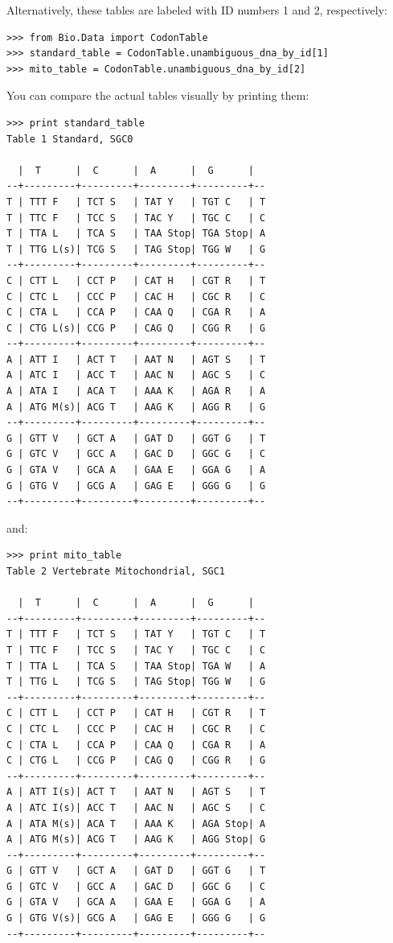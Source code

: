 \documentclass{report}
\begin{document}
Alternatively, these tables are labeled with ID numbers 1 and 2, respectively:
\begin{verbatim}
>>> from Bio.Data import CodonTable
>>> standard_table = CodonTable.unambiguous_dna_by_id[1]
>>> mito_table = CodonTable.unambiguous_dna_by_id[2]
\end{verbatim}

You can compare the actual tables visually by printing them:
\begin{verbatim}
>>> print standard_table
Table 1 Standard, SGC0

  |  T      |  C      |  A      |  G      |
--+---------+---------+---------+---------+--
T | TTT F   | TCT S   | TAT Y   | TGT C   | T
T | TTC F   | TCC S   | TAC Y   | TGC C   | C
T | TTA L   | TCA S   | TAA Stop| TGA Stop| A
T | TTG L(s)| TCG S   | TAG Stop| TGG W   | G
--+---------+---------+---------+---------+--
C | CTT L   | CCT P   | CAT H   | CGT R   | T
C | CTC L   | CCC P   | CAC H   | CGC R   | C
C | CTA L   | CCA P   | CAA Q   | CGA R   | A
C | CTG L(s)| CCG P   | CAG Q   | CGG R   | G
--+---------+---------+---------+---------+--
A | ATT I   | ACT T   | AAT N   | AGT S   | T
A | ATC I   | ACC T   | AAC N   | AGC S   | C
A | ATA I   | ACA T   | AAA K   | AGA R   | A
A | ATG M(s)| ACG T   | AAG K   | AGG R   | G
--+---------+---------+---------+---------+--
G | GTT V   | GCT A   | GAT D   | GGT G   | T
G | GTC V   | GCC A   | GAC D   | GGC G   | C
G | GTA V   | GCA A   | GAA E   | GGA G   | A
G | GTG V   | GCG A   | GAG E   | GGG G   | G
--+---------+---------+---------+---------+--
\end{verbatim}
\noindent and:
\begin{verbatim}
>>> print mito_table
Table 2 Vertebrate Mitochondrial, SGC1

  |  T      |  C      |  A      |  G      |
--+---------+---------+---------+---------+--
T | TTT F   | TCT S   | TAT Y   | TGT C   | T
T | TTC F   | TCC S   | TAC Y   | TGC C   | C
T | TTA L   | TCA S   | TAA Stop| TGA W   | A
T | TTG L   | TCG S   | TAG Stop| TGG W   | G
--+---------+---------+---------+---------+--
C | CTT L   | CCT P   | CAT H   | CGT R   | T
C | CTC L   | CCC P   | CAC H   | CGC R   | C
C | CTA L   | CCA P   | CAA Q   | CGA R   | A
C | CTG L   | CCG P   | CAG Q   | CGG R   | G
--+---------+---------+---------+---------+--
A | ATT I(s)| ACT T   | AAT N   | AGT S   | T
A | ATC I(s)| ACC T   | AAC N   | AGC S   | C
A | ATA M(s)| ACA T   | AAA K   | AGA Stop| A
A | ATG M(s)| ACG T   | AAG K   | AGG Stop| G
--+---------+---------+---------+---------+--
G | GTT V   | GCT A   | GAT D   | GGT G   | T
G | GTC V   | GCC A   | GAC D   | GGC G   | C
G | GTA V   | GCA A   | GAA E   | GGA G   | A
G | GTG V(s)| GCG A   | GAG E   | GGG G   | G
--+---------+---------+---------+---------+--
\end{verbatim}
\end{document}
